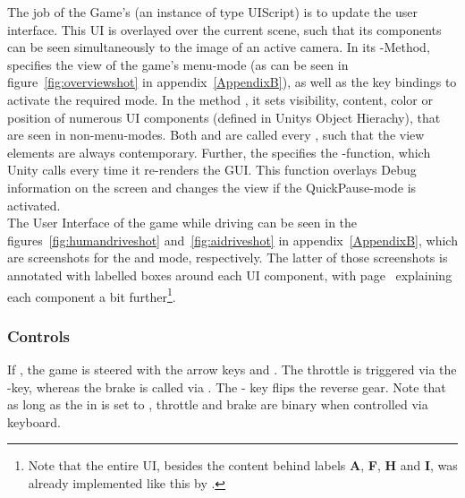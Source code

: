 The job of the Game's  (an instance of type UIScript) is to update the user interface. This UI is overlayed over the current scene, such that its components can be seen simultaneously to the image of an active camera. In its -Method,  specifies the view of the game's menu-mode (as can be seen in figure~\ref{fig:overviewshot} in appendix~\ref{AppendixB}), as well as the key bindings to activate the required mode. In the method , it sets visibility, content, color or position of numerous UI components (defined in Unitys Object Hierachy), that are seen in non-menu-modes. Both  and  are called every , such that the view elements are always contemporary. Further, the  specifies the -function, which Unity calls every time it re-renders the GUI. This function overlays Debug information on the screen and changes the view if the QuickPause-mode is activated.\\

\noindent The User Interface of the game while driving can be seen in the figures~\ref{fig:humandriveshot} and~\ref{fig:aidriveshot} in appendix~\ref{AppendixB}, which are screenshots for the  and  mode, respectively. The latter of those screenshots is annotated with labelled boxes around each UI component, with page~\pageref{fig:aidriveshot} explaining each component a bit further\footnote{Note that the entire UI, besides the content behind labels \textbf{A}, \textbf{F}, \textbf{H} and \textbf{I}, was already implemented like this by \leon.}.

\subsubsection{Controls}

If , the game is steered with the arrow keys \keystroke{$\leftarrow$} and \mbox{\keystroke{$\rightarrow$}.} The throttle is triggered via the -key, whereas the brake is called via . The  - key flips the reverse gear. Note that as long as the  in  is set to , throttle and brake are binary when controlled via keyboard. 

